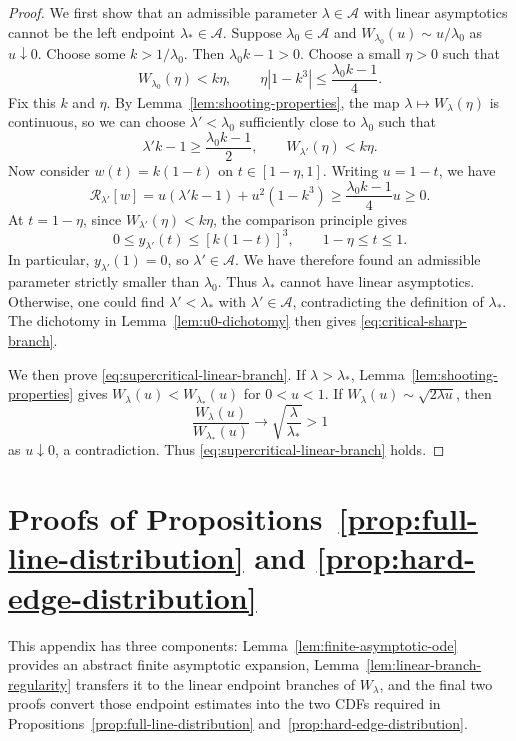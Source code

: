 \documentclass[12pt]{amsart}
\numberwithin{equation}{section}
\theoremstyle{plain}
\theoremstyle{definition}
\begin{document}
\begin{proof}
We first show that an admissible parameter $\lambda\in\mathcal A$ with
linear asymptotics cannot be the left endpoint $\lambda_*\in\mathcal A$.
Suppose $\lambda_0\in\mathcal A$ and
\(W_{\lambda_0}(u)\sim u/\lambda_0\) as \(u\downarrow 0\).
Choose some \(k>1/\lambda_0\). Then
\(\lambda_0k-1>0\). Choose a small \(\eta>0\) such that
\[
 W_{\lambda_0}(\eta)<k\eta,
 \qquad
 \eta|1-k^3|\le\frac{\lambda_0k-1}{4}.
\]
Fix this \(k\) and \(\eta\). By Lemma~\ref{lem:shooting-properties}, the map
\(\lambda\mapsto W_\lambda(\eta)\) is continuous, so we can choose \(\lambda'<\lambda_0\) sufficiently close
to \(\lambda_0\) such that
\[
 \lambda'k-1\ge\frac{\lambda_0k-1}{2},
 \qquad
 W_{\lambda'}(\eta)<k\eta.
\]
Now consider $w(t)=k(1-t)$ on $t\in[1-\eta,1]$.  Writing
$u=1-t$, we have
\[
 \mathcal R_{\lambda'}[w]
 =u(\lambda'k-1)+u^2(1-k^3)
 \ge\frac{\lambda_0k-1}{4}u\ge0.
\]
At \(t=1-\eta\), since \(W_{\lambda'}(\eta)<k\eta\), the comparison principle gives
\[
 0\le y_{\lambda'}(t)\le[k(1-t)]^3,
 \qquad 1-\eta\le t\le1.
\]
In particular, \(y_{\lambda'}(1)=0\), so \(\lambda'\in\mathcal A\).  We have
therefore found an admissible parameter strictly smaller than \(\lambda_0\).
Thus $\lambda_*$ cannot have linear asymptotics.  Otherwise, one could
find $\lambda'<\lambda_*$ with $\lambda'\in\mathcal A$, contradicting
the definition of $\lambda_*$.  The dichotomy in
Lemma~\ref{lem:u0-dichotomy} then gives
\eqref{eq:critical-sharp-branch}.

We then prove \eqref{eq:supercritical-linear-branch}.
If \(\lambda>\lambda_*\), Lemma~\ref{lem:shooting-properties} gives
$W_\lambda(u)<W_{\lambda_*}(u)$ for $0<u<1$.  If
$W_\lambda(u)\sim\sqrt{2\lambda u}$, then
\[
 \frac{W_\lambda(u)}{W_{\lambda_*}(u)}\longrightarrow
 \sqrt{\frac \lambda{\lambda_*}}>1
\]
as \(u\downarrow0\), a contradiction.  Thus
\eqref{eq:supercritical-linear-branch} holds.
\end{proof}

\section{Proofs of Propositions~\ref{prop:full-line-distribution} and \ref{prop:hard-edge-distribution} }
\label{app:regularity}

This appendix has three components: Lemma~\ref{lem:finite-asymptotic-ode}
provides an abstract finite asymptotic expansion,
Lemma~\ref{lem:linear-branch-regularity} transfers it to the linear endpoint
branches of $W_\lambda$, and the final two proofs convert those endpoint
estimates into the two CDFs required in
Propositions~\ref{prop:full-line-distribution}
and~\ref{prop:hard-edge-distribution}.
\end{document}
